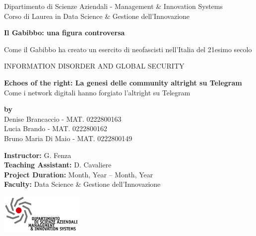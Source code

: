 \documentclass[12pt]{article}
\begin{document}
\begin{titlepage}
		{\large\color{white}Dipartimento di Scienze Aziendali - Management \& Innovation Systems\\
			Corso di Laurea in Data Science \& Gestione dell'Innovazione\par}
		\vspace{0.8cm}
		
		{\Huge\color{white}\textbf{ Il Gabibbo: una figura controversa}\par}
		\vspace{1cm}
		
		{\Large\color{white} Come il Gabibbo ha creato un esercito di neofascisti nell'Italia del 21esimo secolo\par}
		\vspace{1.5cm}
		
		{\large\color{white}INFORMATION DISORDER AND GLOBAL SECURITY\par}
		\vspace{0.5cm}
		
		\vfill
		
	\end{titlepage}
	\newpage
	\begin{titlepage}
		\centering
		\vspace*{1cm}
		
		{\Huge \textbf{Echoes of the right: La genesi delle community altright su Telegram}}\\
		\vspace{0.5cm}
		{\LARGE Come i network digitali hanno forgiato l'altright su Telegram}\\
		\vspace{1.5cm}
		
		\textbf{by}\\
		\vspace{0.5cm}
		{\Large Denise Brancaccio - MAT. 0222800163}\\
		{\Large Lucia Brando - MAT. 0222800162}\\
		{\Large Bruno Maria Di Maio - MAT. 0222800149}
		\vspace{0.5cm}
		
		\vfill
		
		\textbf{Instructor:} G. Fenza \\
		\textbf{Teaching Assistant:} D. Cavaliere \\
		\textbf{Project Duration:} Month, Year -- Month, Year \\
		\textbf{Faculty:} Data Science \& Gestione dell'Innovazione \\
		\vspace{1cm}
		
		\includegraphics[width=0.3\textwidth]{immagini/logodisamis}\\
		\vspace{0.5cm}
		\vspace*{1cm}
	\end{titlepage}
\end{document}

